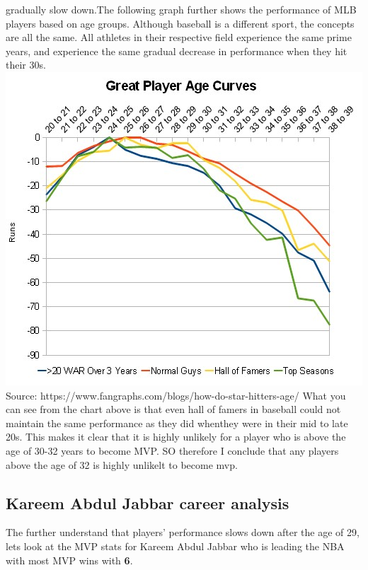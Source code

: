 \documentclass[11pt]{article}
\makeatletter
\def\maxwidth{\ifdim\Gin@nat@width>\linewidth\linewidth
    \else\Gin@nat@width\fi}
\let\Oldincludegraphics\includegraphics
\renewcommand{\includegraphics}[1]{\Oldincludegraphics[width=.8\maxwidth]{#1}}
\makeatother
\begin{document}
gradually slow down.The following graph further shows the performance of
MLB players based on age groups. Although baseball is a different sport,
the concepts are all the same. All athletes in their respective field
experience the same prime years, and experience the same gradual
decrease in performance when they hit their 30s. \newline
\includegraphics{greatplayers.png} \newline  Source:
https://www.fangraphs.com/blogs/how-do-star-hitters-age/ \newline
\newline
What you can see from the chart above is that even hall of famers in
baseball could not maintain the same performance as they did whenthey
were in their mid to late 20s. This makes it clear that it is highly
unlikely for a player who is above the age of 30-32 years to become MVP.
SO therefore I conclude that any players above the age of 32 is highly
unlikelt to become mvp.

    \subsection{Kareem Abdul Jabbar career
analysis}\label{kareem-abdul-jabbar-career-analysis}

The further understand that players' performance slows down after the
age of 29, lets look at the MVP stats for Kareem Abdul Jabbar who is
leading the NBA with most MVP wins with \textbf{6}.
\end{document}
